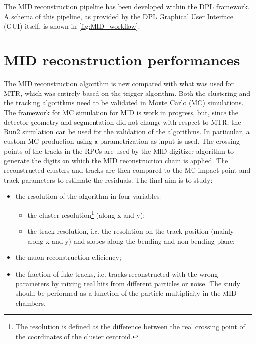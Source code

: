 The MID reconstruction pipeline has been developed within the DPL framework.
A schema of this pipeline, as provided by the DPL Graphical User Interface (GUI) itself, is shown in \ref{fig:MID_workflow}.

\section{MID reconstruction performances}
The MID reconstruction algorithm is new compared with what was used for MTR, which was entirely based on the trigger algorithm.
Both the clustering and the tracking algorithms need to be validated in Monte Carlo (MC) simulations. 
The framework for MC simulation for MID is work in progress, but, since the detector geometry and segmentation did not change with respect to MTR, the Run2 simulation can be used for the validation of the algorithms. 
In particular, a custom MC production using a \jpsi parametrization as input is used. 
The crossing points of the tracks in the RPCs are used by the MID digitizer algorithm to generate the digits on which the MID reconstruction chain is applied. 
The reconstructed clusters and tracks are then compared to the MC impact point and track parameters to estimate the residuals. 
The final aim is to study:
\begin{itemize}
    \item the resolution of the algorithm in four variables: 
    \begin{itemize}
        \item the cluster resolution\footnote{The resolution is defined as the difference between the real crossing point of the coordinates of the cluster centroid.} (along x and y);
        \item the track resolution, i.e. the resolution on the track position (mainly along x and y) and slopes along the bending and non bending plane;
    \end{itemize}
    
    \item the muon reconstruction efficiency;
    \item the fraction of fake tracks, i.e. tracks reconstructed with the wrong parameters by mixing real hits from different particles or noise. The study should be performed as a function of the particle multiplicity in the MID chambers.
\end{itemize}

